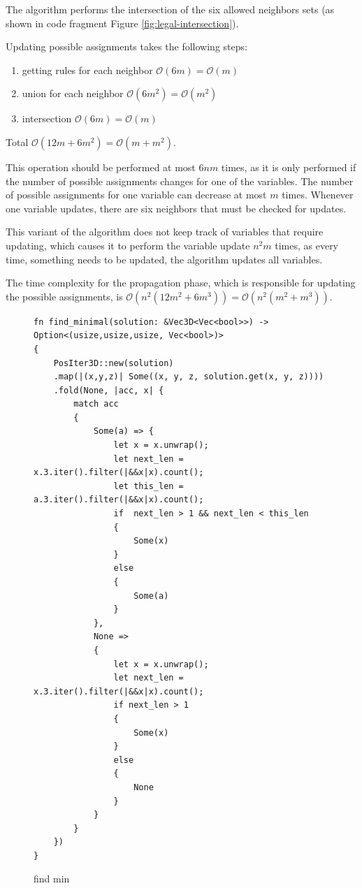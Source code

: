 \documentclass[shortabstract, english, inz]{iithesis}
\begin{document}
The algorithm performs the intersection of the six allowed neighbors sets (as shown in code fragment Figure \ref{fig:legal-intersection}).

Updating possible assignments takes the following steps:
\begin{enumerate}
    \item getting rules for each neighbor \(\mathcal{O}(6m) = \mathcal{O}(m)\)
    \item union for each neighbor \(\mathcal{O}(6m^2) = \mathcal{O}(m^2)\)
    \item intersection \(\mathcal{O}(6m) = \mathcal{O}(m)\)
\end{enumerate}
Total \(\mathcal{O}(12m + 6m^2) = \mathcal{O}(m+m^2)\).

This operation should be performed at most \(6nm\) times, as it is only performed if the number of possible assignments changes for one of the variables. The number of possible assignments for one variable can decrease at most \(m\) times. Whenever one variable updates, there are six neighbors that must be checked for updates.

This variant of the algorithm does not keep track of variables that require updating, which causes it to perform the variable update \(n^2m\) times, as every time, something needs to be updated, the algorithm updates all variables.

The time complexity for the propagation phase, which is responsible for updating the possible assignments, is \(\mathcal{O}(n^2(12m^2 + 6m^3)) = \mathcal{O}(n^2(m^2+m^3))\).

\begin{figure}
\begin{verbatim}
fn find_minimal(solution: &Vec3D<Vec<bool>>) -> Option<(usize,usize,usize, Vec<bool>)>
{
    PosIter3D::new(solution)
    .map(|(x,y,z)| Some((x, y, z, solution.get(x, y, z))))
    .fold(None, |acc, x| {
        match acc
        {
            Some(a) => {
                let x = x.unwrap();
                let next_len = x.3.iter().filter(|&&x|x).count();
                let this_len = a.3.iter().filter(|&&x|x).count();
                if  next_len > 1 && next_len < this_len
                {
                    Some(x)
                }
                else
                {
                    Some(a)
                }
            },
            None =>
            {
                let x = x.unwrap();
                let next_len = x.3.iter().filter(|&&x|x).count();
                if next_len > 1
                {
                    Some(x)
                }
                else
                {
                    None
                }
            }
        }
    })
}
\end{verbatim}
\caption{find min}
\label{fig:observe-findmin}
\end{figure}
\end{document}
